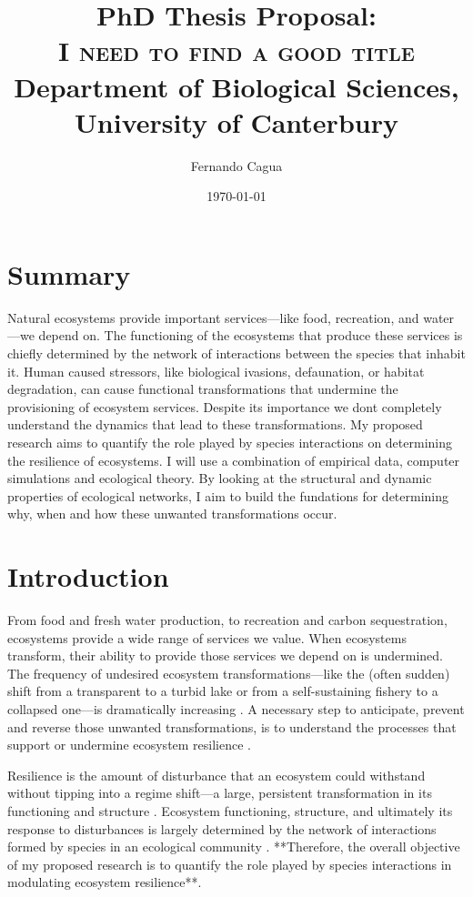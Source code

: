 \documentclass[a4paper]{report}
\title{
	{\large PhD Thesis Proposal:} \\
	{\Huge \textsc{I need to find a good title}} \\
	{\large Department of Biological Sciences, University of Canterbury}
}
\author{
  {\Large Fernando Cagua} \\
}
\date{\normalsize \today}
\begin{document}
\maketitle

\chapter*{Summary}

Natural ecosystems provide important services---like food, recreation, and water---we depend on. 
The functioning of the ecosystems that produce these services is chiefly determined by the network of interactions between the species that inhabit it. 
Human caused stressors, like biological ivasions, defaunation, or habitat degradation, can cause functional transformations that undermine the provisioning of ecosystem services. 
Despite its importance we dont completely understand the dynamics that lead to these transformations.
My proposed research aims to quantify the role played by species interactions on determining the resilience of ecosystems.
I will use a combination of empirical data, computer simulations and ecological theory. 
By looking at the structural and dynamic properties of ecological networks, I aim to build the fundations for determining why, when and how these unwanted transformations occur. 

\chapter*{Introduction}

From food and fresh water production, to recreation and carbon sequestration, ecosystems provide a wide range of services we value. When ecosystems transform, their ability to provide those services we depend on is undermined. 
The frequency of undesired ecosystem transformations---like the (often sudden) shift from a transparent to a turbid lake or from a self-sustaining fishery to a collapsed one---is dramatically increasing \cite{Scheffer2001a}. 
A necessary step to anticipate, prevent and reverse those unwanted transformations, is to understand the processes that support or undermine ecosystem resilience \cite{Hughes2005, Tylianakis2008}. 

Resilience is the amount of disturbance that an ecosystem could withstand without tipping into a regime shift---a large, persistent transformation in its functioning and structure \cite{Holling1973, Gunderson2000}. 
Ecosystem functioning, structure, and ultimately its response to disturbances is largely determined by the network of interactions formed by species in an ecological community \cite{Bascompte2006, Dobson2006, Tylianakis2008, Reiss2009}. 
**Therefore, the overall objective of my proposed research is to quantify the role played by species interactions in modulating ecosystem resilience**.  
\end{document}
